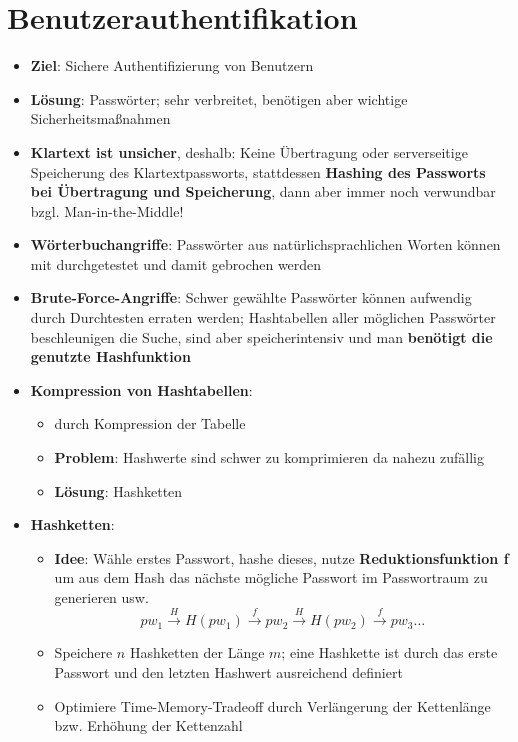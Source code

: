\section{Benutzerauthentifikation}%
\label{benauth:sec:benutzerauthentifikation}

\begin{itemize}
	\item \textbf{Ziel}: Sichere Authentifizierung von Benutzern
	\item \textbf{Lösung}: Passwörter; sehr verbreitet, benötigen aber wichtige Sicherheitsmaßnahmen
	\item \textbf{Klartext ist unsicher}, deshalb: Keine Übertragung oder serverseitige Speicherung des Klartextpassworts, stattdessen \textbf{Hashing des Passworts bei Übertragung und Speicherung}, dann aber immer noch verwundbar bzgl. Man-in-the-Middle!
	\item \textbf{Wörterbuchangriffe}: Passwörter aus natürlichsprachlichen Worten können mit  durchgetestet und damit gebrochen werden
	\item \textbf{Brute-Force-Angriffe}: Schwer gewählte Passwörter können aufwendig durch Durchtesten erraten werden; Hashtabellen aller möglichen Passwörter beschleunigen die Suche, sind aber speicherintensiv und man \textbf{benötigt die genutzte Hashfunktion}
	\item \textbf{Kompression von Hashtabellen}:
	\begin{itemize}
		\item {} durch Kompression der Tabelle
		\item \textbf{Problem}: Hashwerte sind schwer zu komprimieren da nahezu zufällig
		\item \textbf{Lösung}: Hashketten
	\end{itemize}
	\item \textbf{Hashketten}:
	\begin{itemize}
		\item \textbf{Idee}: Wähle erstes Passwort, hashe dieses, nutze \textbf{Reduktionsfunktion f} um aus dem Hash das nächste mögliche Passwort im Passwortraum zu generieren usw.
		$$
			pw_1 \xrightarrow{H} H(pw_1) \xrightarrow{f} pw_2 \xrightarrow{H} H(pw_2) \xrightarrow{f} pw_3 \dots
		$$
		\item Speichere $n$ Hashketten der Länge $m$; eine Hashkette ist durch das erste Passwort und den letzten Hashwert ausreichend definiert
		\item Optimiere Time-Memory-Tradeoff durch Verlängerung der Kettenlänge bzw. Erhöhung der Kettenzahl

\end{itemize}
\end{itemize}
